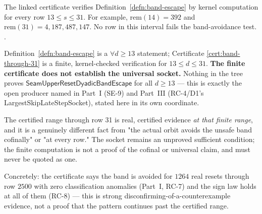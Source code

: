 \begin{obs}
\label{cert:band-through-31}
The linked certificate verifies Definition~\ref{defn:band-escape} by kernel computation for every
row $13\le s\le31$. For example, $\mathrm{rem}(14)=392$ and
$\mathrm{rem}(31)=4{,}187{,}487{,}147$. No row in this interval fails the band-avoidance test.
.
\end{obs}

\begin{rem}
\label{rem:band-caveat}
Definition~\ref{defn:band-escape} is a $\forall d\ge13$ statement; Certificate
\ref{cert:band-through-31} is a finite, kernel-checked verification for $13\le d\le31$. \textbf{The
finite certificate does not establish the universal socket.} Nothing in the tree proves
$\mathsf{SeamUpperResetDyadicBandEscape}$ for all $d\ge13$ — this is exactly the open producer named
in Part~I (SE-9) and Part~III (RC-4/D1's \textsf{LargestSkipLateStepSocket}), stated here in its own
coordinate.

\par\medskip

The certified range through row 31 is real, certified evidence \emph{at that finite
range}, and it is a genuinely different fact from "the actual orbit avoids the unsafe band
cofinally" or "at every row." The socket remains an unproved sufficient condition; the finite
computation is not a proof of the cofinal or universal claim, and must never be quoted as one.

\par\medskip

Concretely: the certificate says the band is avoided for $1264$ real resets through row $2500$ with
zero classification anomalies (Part~I, RC-7) and the sign law holds at all of them (RC-8) — this is
strong disconfirming-of-a-counterexample evidence, not a proof that the pattern continues past the
certified range.
\end{rem}
